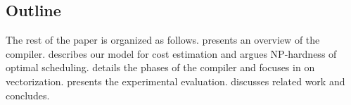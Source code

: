 \subsection{Outline}

The rest of the paper is organized as follows.  presents an overview of the compiler.  describes our model for cost estimation and argues NP-hardness of optimal scheduling.  details the phases of the compiler and  focuses in on vectorization.  presents the experimental evaluation. discusses related work and  concludes.


